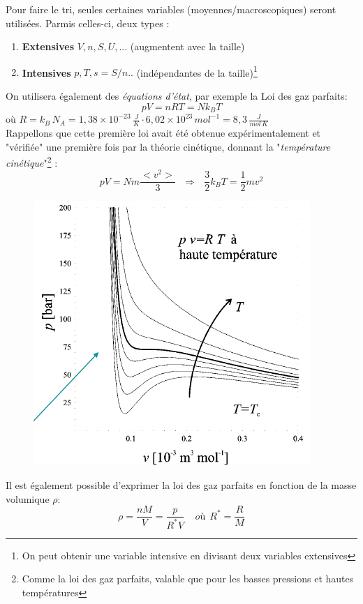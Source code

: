 \documentclass[11pt, a4paper, openany]{book}
\begin{document}
		Pour faire le tri, seules certaines variables (moyennes/macroscopiques) seront utilisées. Parmis celles-ci, deux types :
		\begin{enumerate}
			\item \textbf{Extensives} $V, n, S, U, ...$ (augmentent avec la taille)
			\item \textbf{Intensives} $p, T, s = S/n..$ (indépendantes de la taille)\footnote{On peut obtenir une variable intensive en divisant deux variables extensives}
		\end{enumerate}
		On utilisera également des \textit{équations d'état}, par exemple la Loi des gaz parfaits:
		\begin{equation}
			pV = nRT = Nk_BT
		\end{equation}
		où $R =k_B\,N_A=1,38\times 10^{-23}\,\frac{J}{K}\cdot 6,02\times 10^{23}\,mol^{-1}=8,3\,\frac{J}{mol\, K}$\\
		Rappellons que cette première loi avait été obtenue expérimentalement et "vérifiée" une première fois par la théorie cinétique, donnant la "\textit{température cinétique}"\footnote{Comme la loi des gaz parfaits, valable que pour les basses pressions et hautes températures} :
		\begin{equation}
			pV = Nm\frac{<v^2>}{3}\ \ \ \Rightarrow\ \ \ \frac{3}{2}k_BT = \frac{1}{2}mv^2
		\end{equation}
		\begin{figure}
			\includegraphics[scale=0.5]{cp/image2.png}
		\end{figure}
		Il est également possible d'exprimer la loi des gaz parfaits en fonction de la masse volumique $\rho$:
		\begin{equation}
			\rho = \frac{nM}{V} = \frac{p}{R^*V}\ \ \ \ \ où\ \ R^* = \frac{R}{M}
		\end{equation}
		
\end{document}
